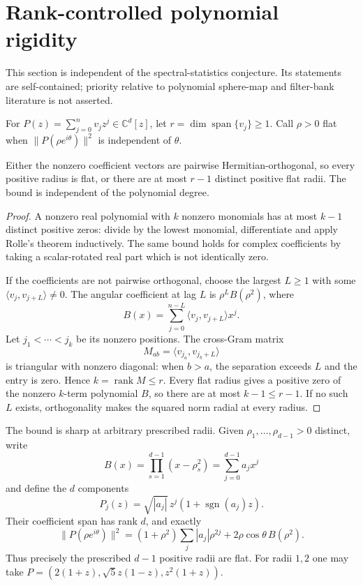 \section{Rank-controlled polynomial rigidity}
\label{sec:polynomial-multisphere}
This section is independent of the spectral-statistics conjecture. Its
statements are self-contained; priority relative to polynomial sphere-map
and filter-bank literature is not asserted.

For $P(z)=\sum_{j=0}^nv_jz^j\in\mathbb C^d[z]$, let
$r=\dim\operatorname{span}\{v_j\}\ge1$. Call $\rho>0$ flat when
$\|P(\rho e^{i\theta})\|^2$ is independent of $\theta$.

\begin{theorem}\label{thm:multiradius}
Either the nonzero coefficient vectors are pairwise Hermitian-orthogonal,
so every positive radius is flat, or there are at most $r-1$ distinct
positive flat radii. The bound is independent of the polynomial degree.
\end{theorem}
\begin{proof}
A nonzero real polynomial with $k$ nonzero monomials has at most $k-1$
distinct positive zeros: divide by the lowest monomial, differentiate and
apply Rolle's theorem inductively. The same bound holds for complex
coefficients by taking a scalar-rotated real part which is not identically
zero.

If the coefficients are not pairwise orthogonal, choose the largest
$L\ge1$ with some $\langle v_j,v_{j+L}\rangle\ne0$. The angular coefficient
at lag $L$ is $\rho^LB(\rho^2)$, where
\[
 B(x)=\sum_{j=0}^{n-L}\langle v_j,v_{j+L}\rangle x^j.
\]
Let $j_1<\cdots<j_k$ be its nonzero positions. The cross-Gram matrix
\[
 M_{ab}=\langle v_{j_a},v_{j_b+L}\rangle
\]
is triangular with nonzero diagonal: when $b>a$, the separation exceeds
$L$ and the entry is zero. Hence $k=\operatorname{rank}M\le r$.
Every flat radius gives a positive zero of the nonzero $k$-term polynomial
$B$, so there are at most $k-1\le r-1$. If no such $L$ exists, orthogonality
makes the squared norm radial at every radius.
\end{proof}

The bound is sharp at arbitrary prescribed radii. Given
$\rho_1,\ldots,\rho_{d-1}>0$ distinct, write
\[
 B(x)=\prod_{s=1}^{d-1}(x-\rho_s^2)=\sum_{j=0}^{d-1}a_jx^j
\]
and define the $d$ components
\[
 P_j(z)=\sqrt{|a_j|}\,z^j(1+\operatorname{sgn}(a_j)z).
\]
Their coefficient span has rank $d$, and exactly
\[
 \|P(\rho e^{i\theta})\|^2
 =(1+\rho^2)\sum_j|a_j|\rho^{2j}+2\rho\cos\theta\,B(\rho^2).
\]
Thus precisely the prescribed $d-1$ positive radii are flat. For radii $1,2$
one may take $P=(2(1+z),\sqrt5z(1-z),z^2(1+z))$.

